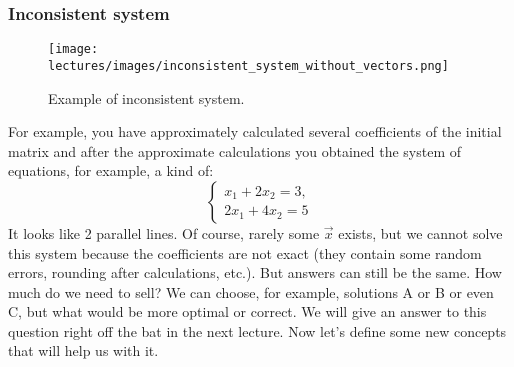     \subsubsection*{Inconsistent system}
    \begin{wrapfigure}[12]{r}{0.24\columnwidth}
        \texttt{[image: lectures/images/inconsistent\_system\_without\_vectors.png]}
        \caption*{\scriptsize{Example of inconsistent system.}}
        \label{fig:inconsistent}
    \end{wrapfigure}
    For example, you have approximately calculated several coefficients of the initial matrix and after the approximate calculations you obtained the system of equations, for example, a kind of: 
    \[
        \left\{ \begin{array}{c}
        x_1 + 2x_2 = 3,\\
        2x_1 + 4x_2 = 5
           \end{array}
        \right. 
    \]
    It looks like 2 parallel lines. Of course, rarely some $\vec{x}$ exists, but we cannot solve this system because the coefficients are not exact (they contain some random errors, rounding after calculations, etc.). But answers can still be the same. How much do we need to sell? We can choose, for example, solutions A or B or even C, but what would be more optimal or correct. We will give an answer to this question right off the bat in the next lecture. Now let's define some new concepts that will help us with it.
